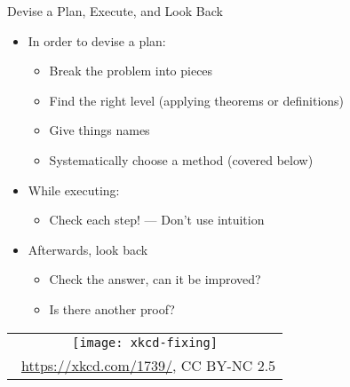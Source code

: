 \begin{frame}{Devise a Plan, Execute, and Look Back}


	\begin{itemize}
	
		\item In order to devise a plan:

		\begin{itemize}
					
						\item Break the problem into pieces
						
						\item Find the right level (applying theorems or definitions)
						
						\item Give things names
						
						\item Systematically choose a method (covered below)
						
					\end{itemize}

		\item While executing:

				\begin{itemize}
					
						\item Check each step! --- Don't use intuition
					
					\end{itemize}
					
					
		\item Afterwards, look back
					
					
					
					\begin{itemize}
					
						\item Check the answer, can it be improved?
						
						\item Is there another proof?
					
					\end{itemize}
					
		\end{itemize}
		
		\begin{center}
		\begin{tabular}{c}
		\texttt{[image: xkcd-fixing]}\\[-1ex]
		{\tiny \textcopyright~\url{https://xkcd.com/1739/}, CC BY-NC 2.5}
		\end{tabular}
		\end{center}

\end{frame}

